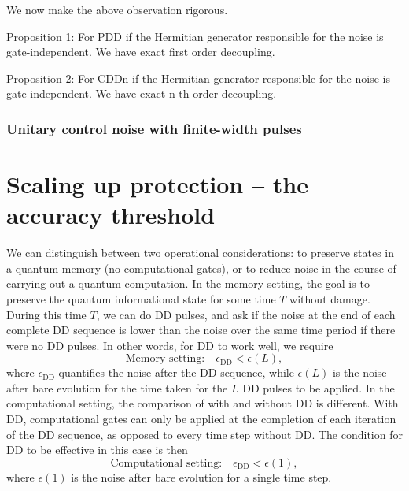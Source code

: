 \documentclass[pra,reprint,superscriptaddress]{revtex4-2}
\begin{document}
We now make the above observation rigorous. 

Proposition 1: For PDD if the Hermitian generator responsible for the noise is gate-independent. We have exact first order decoupling. 

Proposition 2: For CDDn if the Hermitian generator responsible for the noise is gate-independent. We have exact n-th order decoupling. 

\subsubsection{Unitary control noise with finite-width pulses}





\newpage
\section{Scaling up protection -- the accuracy threshold}\label{sec:threshold}
We can distinguish between two operational considerations: to preserve states in a quantum memory (no computational gates), or to reduce noise in the course of carrying out a quantum computation. In the memory setting, the goal is to preserve the quantum informational state for some time $T$ without damage. During this time $T$, we can do DD pulses, and ask if the noise at the end of each complete DD sequence is lower than the noise over the same time period if there were no DD pulses. In other words, for DD to work well, we require
\begin{equation}
\textrm{Memory setting:}\quad \epsilon_\mathrm{DD}<\epsilon(L),
\end{equation}
where $\epsilon_\mathrm{DD}$ quantifies the noise after the DD sequence, while $\epsilon(L)$ is the noise after bare evolution for the time taken for the $L$ DD pulses to be applied.
In the computational setting, the comparison of with and without DD is different. With DD, computational gates can only be applied at the completion of each iteration of the DD sequence, as opposed to every time step without DD. The condition for DD to be effective in this case is then
\begin{equation}\label{eq:cond}
\textrm{Computational setting:}\quad\epsilon_\mathrm{DD}<\epsilon(1),
\end{equation}
where $\epsilon(1)$ is the noise after bare evolution for a single time step. 
\end{document}
